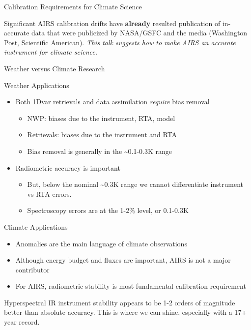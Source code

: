 \documentclass[10pt,t]{beamer}
\begin{document}
\begin{frame}[label={sec:orge26c686},shrink=30]{Calibration Requirements for Climate Science}
\vspace{0.2in}
\begin{large}
Significant AIRS calibration drifts have \textbf{already} resulted publication of in-accurate data that were publicized by NASA/GSFC and the media (Washington Post, Scientific American).  \emph{This talk suggests how to make AIRS an accurate instrument for climate science.}
\end{large}
\end{frame}

\begin{frame}[label={sec:org8b71b96},shrink=20]{Weather versus Climate Research}
\begin{block}{Weather Applications}
\begin{itemize}
\item Both 1Dvar retrievals and data assimilation \emph{require} bias removal
\begin{itemize}
\item NWP: biases due to the instrument, RTA, model
\item Retrievals: biases due to the instrument and RTA
\item Bias removal is generally in the \textasciitilde{}0.1-0.3K range
\end{itemize}
\item Radiometric accuracy is important
\begin{itemize}
\item But, below the nominal \textasciitilde{}0.3K range we cannot differentiate instrument vs RTA errors.
\item Spectroscopy errors are at the 1-2\% level, or 0.1-0.3K
\end{itemize}
\end{itemize}
\end{block}
\begin{block}{Climate Applications}
\begin{itemize}
\item Anomalies are the main language of climate observations
\item Although energy budget and fluxes are important, AIRS is not a major contributor
\item For AIRS, radiometric stability is most fundamental calibration requirement
\end{itemize}

Hyperspectral IR instrument stability appears to be 1-2 orders of magnitude better than absolute accuracy.  This is where we can shine, especially with a 17+ year record.
\end{block}
\end{frame}
\end{document}
